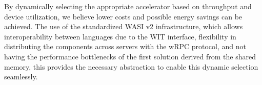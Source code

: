 By dynamically selecting the appropriate accelerator based on throughput and device utilization, we believe lower costs and possible energy savings can be achieved. 
The use of the standardized WASI v2 infrastructure, which allows interoperability between languages due to the WIT interface, flexibility in distributing the components across servers with the wRPC protocol, and not having the performance bottlenecks of the first solution derived from the shared memory, this provides the necessary abstraction to enable this dynamic selection seamlessly.


\pagebreak
